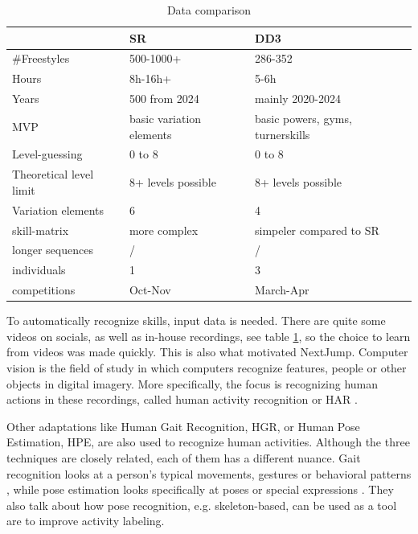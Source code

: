 \begin{table}[t]
    \centering
    \begin{tabular}{|l|l|l|}
        \hline
        & SR & DD3 \\ \hline
        \#Freestyles & 500-1000+ & 286-352 \\ \hline
        Hours & 8h-16h+ & 5-6h \\ \hline
        Years & 500 from 2024 & mainly 2020-2024 \\ \hline
        MVP & basic variation elements & basic powers, gyms, turnerskills \\ \hline
        Level-guessing & 0 to 8 & 0 to 8 \\ \hline
        Theoretical level limit & 8+ levels possible & 8+ levels possible \\ \hline
        Variation elements & 6 & 4 \\ \hline
        skill-matrix & more complex & simpeler compared to SR \\ \hline
        longer sequences & / & / \\ \hline
        individuals & 1 & 3 \\ \hline
        competitions & Oct-Nov & March-Apr \\ \hline
    \end{tabular}
    \caption{Data comparison}
    \label{tbl:data-comparison-sr-dd}
\end{table}

To automatically recognize skills, input data is needed. There are quite some videos on socials, as well as in-house recordings, see table \ref{tbl:data-comparison-sr-dd}, so the choice to learn from videos was made quickly. This is also what motivated NextJump.
Computer vision is the field of study in which computers recognize features, people or other objects in digital imagery. More specifically, the focus is recognizing human actions in these recordings, called human activity recognition or HAR \autocite{Pareek_2020}.

Other adaptations like Human Gait Recognition, HGR, or Human Pose Estimation, HPE, are also used to recognize human activities. Although the three techniques are closely related, each of them has a different nuance. Gait recognition looks at a person's typical movements, gestures or behavioral patterns \autocite{Alharthi_2019}, while pose estimation looks specifically at poses or special expressions \autocite{Song_2021}. They also talk about how pose recognition, e.g. skeleton-based, can be used as a tool are to improve activity labeling.

